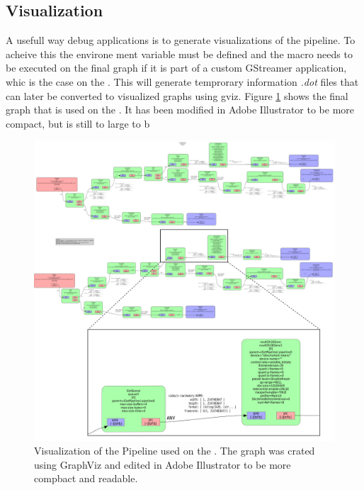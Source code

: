 \subsection{Visualization}
A usefull way debug \gs applications is to generate visualizations of the pipeline.
To acheive this the environe ment variable  must be defined and the  macro needs to be executed on the final graph if it is part of a custom GStreamer application, whic is the case on the \sr.
\cite{johnstonGeneratingGStreamerPipeline2018}
This will generate temprorary information \textit{.dot} files that can later be converted to visualized graphs using \gls{gviz}.
Figure \ref{fig:gs_pipeline_visualization} shows the final graph that is used on the \sr.
It has been modified in Adobe Illustrator to be more compact, but is still to large to b




\begin{figure}[H]
    \centering
    \includegraphics[width=\textwidth]{figures/pipeline.pdf}
    \caption{Visualization of the \gs Pipeline used on the \sr.
        The graph was crated using GraphViz and edited in Adobe Illustrator to be more compbact and readable.}
    \label{fig:gs_pipeline_visualization}
\end{figure}